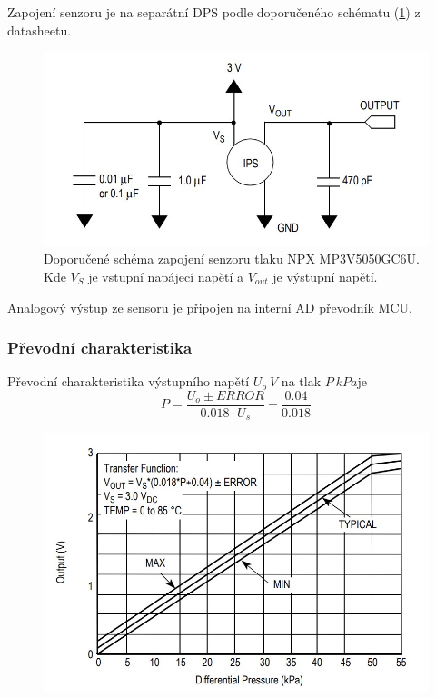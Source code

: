 Zapojení senzoru je na separátní DPS podle doporučeného schématu (\ref{fig:nxp_recommended}) z datasheetu.
\begin{figure}[H]
    \centering
    \includegraphics[width=0.9\linewidth]{pictures/nxp_recommended.jpg}
    \caption{Doporučené schéma zapojení senzoru tlaku NPX MP3V5050GC6U. Kde $V_S$ je vstupní napájecí napětí a $V_{out}$ je výstupní napětí.}
    \label{fig:nxp_recommended}
\end{figure}
Analogový výstup ze sensoru je připojen na interní AD převodník MCU.
\subsubsection{Převodní charakteristika}
Převodní charakteristika výstupního napětí $U_{o} \ V$ na tlak $P \ kPa$je
\begin{equation}
    P = \frac{U_o \pm ERROR}{0.018 \cdot U_s} - \frac{0.04}{0.018}
    \label{eq:nxp_transfer}
\end{equation}

\begin{figure}[H]
    \centering
    \includegraphics[width=0.9\linewidth]{pictures/nxp_transfer.jpg}
    \caption{}
    \label{fig:nxp_transfer}
\end{figure}

